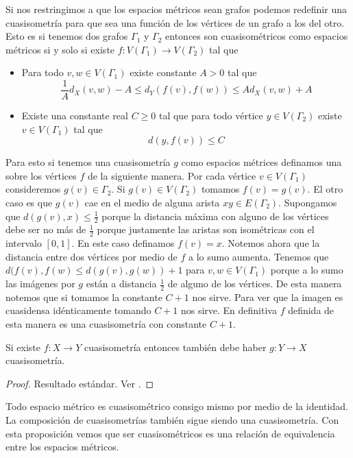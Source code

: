 \documentclass[tesis.tex]{subfiles}
\begin{document}
\begin{obs}
	Si nos restringimos a que los espacios métricos sean grafos podemos redefinir una cuasisometría para que sea una función de los vértices de un grafo a los del otro.
	Esto es si tenemos dos grafos $\Gamma_1$ y $\Gamma_2$ entonces son cuasisométricos como espacios métricos si y solo si existe $f:V(\Gamma_1) \to V(\Gamma_2)$ tal que 
	\begin{itemize}
		\item Para todo $v,w \in V(\Gamma_1)$ existe constante $A > 0$ tal que 
		\[
		\frac{1}{A} d_X(v,w) - A \le d_Y(f(v),f(w)) \le A d_X(v,w) + A
		\]
		\item Existe una constante real $C \ge 0$ tal que para todo vértice $y \in V(\Gamma_2)$ existe $v \in V(\Gamma_1)$ tal que 
		\[
		d(y,f(v)) \le C
		\]
	\end{itemize}
	
	Para esto si tenemos una cuasisometría $g$ como espacios métrices definamos una sobre los vértices $f$ de la siguiente manera.
	Por cada vértice $v \in V(\Gamma_1)$ consideremos $g(v) \in \Gamma_2$. 
	Si $g(v) \in V(\Gamma_2)$ tomamos $f(v)=g(v)$.
	El otro caso es que $g(v)$ cae en el medio de alguna arista $xy \in E(\Gamma_2)$. 
	Supongamos que $d(g(v),x) \le \frac{1}{2}$ porque la distancia máxima con alguno de los vértices debe ser no más de $\frac{1}{2}$ porque justamente las aristas son isométricas con el intervalo $[0,1]$. 
	En este caso definamos $f(v) = x$.
	Notemos ahora que la distancia entre dos vértices por medio de $f$ a lo sumo aumenta. 
	Tenemos que $d(f(v),f(w) \le d (g(v),g(w)) + 1$ para $v,w \in V(\Gamma_1)$ porque a lo sumo las imágenes por $g$ están a distancia $\frac{1}{2}$ de alguno de los vértices.
	De esta manera notemos que si tomamos la constante $C+1$ nos sirve.
	Para ver que la imagen es cuasidensa idénticamente tomando $C+1$ nos sirve.
	En definitiva $f$ definida de esta manera es una cuasisometría con constante $C+1$.	
\end{obs}

\begin{prop}
	Si existe $f:X \to Y$ cuasisometría entonces también debe haber $g:Y \to X$ cuasisometría.
\end{prop}
\begin{proof}
	Resultado estándar. Ver \cite{bridson2013metric}.
\end{proof}

Todo espacio métrico es cuasisométrico consigo mismo por medio de la identidad.
La composición de cuasisometrías también sigue siendo una cuasisometría.
Con esta proposición vemos que ser cuasisométricos es una relación de equivalencia entre los espacios métricos. 
\end{document}
